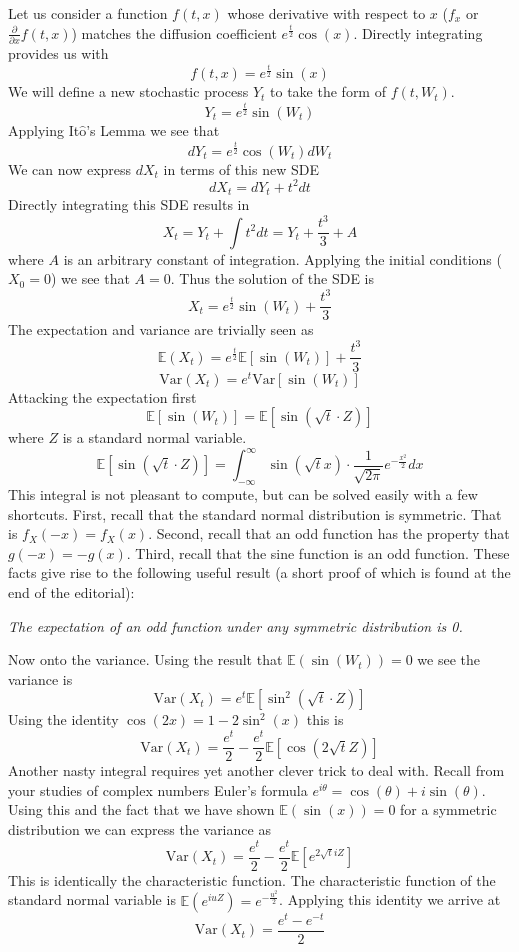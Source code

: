 \documentclass[12pt]{article}
\newcommand{\Itos}{It$\hat{\text{o}}$'s }
\begin{document}
\bigskip
\noindent
Let us consider a function \(f(t, x)\) whose derivative with respect to $x$ ($f_x$ or \(\frac{\partial}{\partial x}f(t,x)\)) matches the diffusion coefficient \(e^{\frac{t}{2}}\cos(x)\). Directly integrating provides us with
\[
f(t,x) = e^{\frac{t}{2}}\sin(x)
\]
We will define a new stochastic process $Y_t$ to take the form of $f(t,W_t)$.
\[
Y_t = e^{\frac{t}{2}}\sin(W_t)
\]
Applying \Itos Lemma we see that
\[
dY_t = e^{\frac{t}{2}}\cos(W_t)dW_t
\]
We can now express $dX_t$ in terms of this new SDE
\[
dX_t = dY_t + t^2dt
\]
Directly integrating this SDE results in
\[
X_t = Y_t + \int t^2dt = Y_t + \frac{t^3}{3} + A
\]
where $A$ is an arbitrary constant of integration. Applying the initial conditions ($X_0 = 0$) we see that $A=0$. Thus the solution of the SDE is
\[
X_t = e^{\frac{t}{2}}\sin(W_t) + \frac{t^3}{3}
\]
The expectation and variance are trivially seen as
\[
\mathbb{E}(X_t) = e^{\frac{t}{2}}\mathbb{E}\left[\sin(W_t)\right] + \frac{t^3}{3}
\]
\[
\mathrm{Var}(X_t) = e^{t}\mathrm{Var}\left[\sin(W_t)\right]
\]
Attacking the expectation first
\[
\mathbb{E}\left[\sin(W_t)\right] = \mathbb{E}\left[\sin\left(\sqrt{t}\cdot Z\right)\right]
\]
where $Z$ is a standard normal variable.
\[
\mathbb{E}\left[\sin\left(\sqrt{t}\cdot Z\right)\right] = \int_{-\infty}^{\infty}\sin\left(\sqrt{t}x\right)\cdot \frac{1}{\sqrt{2\pi}}e^{-\frac{x^2}{2}}dx
\]
This integral is not pleasant to compute, but can be solved easily with a few shortcuts. First, recall that the standard normal distribution is symmetric. That is \(f_X(-x) = f_X(x)\).
Second, recall that an odd function has the property that \(g(-x)=-g(x)\). Third, recall that the sine function is an odd function. These facts give rise to the following useful result (a short proof of which is found at the end of the editorial):

\begin{center}
\textit{The expectation of an odd function under any symmetric distribution is 0.}
\end{center}

Now onto the variance. Using the result that $\mathbb{E}(\sin(W_t))=0$ we see the variance is
\[
\mathrm{Var}(X_t) = e^t\mathbb{E}\left[\sin^2\left(\sqrt{t}\cdot Z\right)\right]
\]
Using the identity \(\cos(2x) = 1 - 2\sin^2(x)\) this is
\[
\mathrm{Var}(X_t) = \frac{e^t}{2}- \frac{e^t}{2}\mathbb{E}\left[\cos\left(2\sqrt{t} Z\right)\right]
\]
Another nasty integral requires yet another clever trick to deal with. Recall from your studies of complex numbers Euler's formula \(e^{i\theta} = \cos\left(\theta\right) + i\sin\left(\theta\right)\). Using this and the fact that we have shown \(\mathbb{E}\left(\sin(x)\right) = 0\) for a symmetric distribution we can express the variance as
\[
\mathrm{Var}(X_t) = \frac{e^t}{2}- \frac{e^t}{2}\mathbb{E}\left[e^{2\sqrt{t}i Z}\right]
\]
This is identically the characteristic function. The characteristic function of the standard normal variable is \(\mathbb{E}(e^{iuZ}) = e^{-\frac{u^2}{2}}\). Applying this identity we arrive at
\[
\mathrm{Var}(X_t) = \frac{e^t-e^{-t}}{2}
\]
\end{document}
